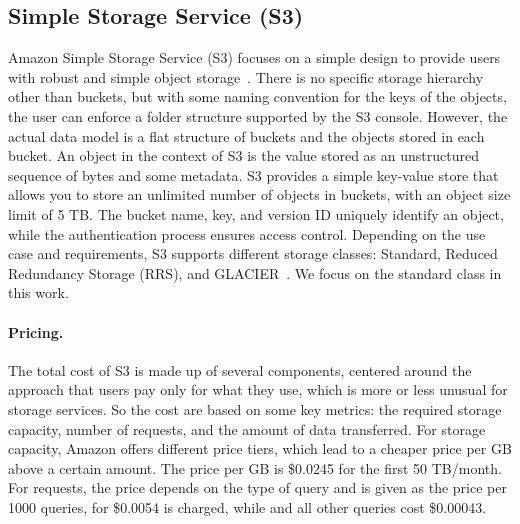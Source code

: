 \subsection{Simple Storage Service (S3)}
\label{subsec:s3}
Amazon Simple Storage Service (S3) focuses on a simple design to provide users with robust and simple object storage~\cite{noauthor_cloud_nodate-1}. There is no specific storage hierarchy other than buckets, but with some naming convention for the keys of the objects, the user can enforce a folder structure supported by the S3 console. However, the actual data model is a flat structure of buckets and the objects stored in each bucket. An object in the context of S3 is the value stored as an unstructured sequence of bytes and some metadata. S3 provides a simple key-value store that allows you to store an unlimited number of objects in buckets, with an object size limit of 5 TB. The bucket name, key, and version ID uniquely identify an object, while the authentication process ensures access control. Depending on the use case and requirements, S3 supports different storage classes: Standard, Reduced Redundancy Storage (RRS), and GLACIER~\cite{noauthor_amazon_nodate-2}. We focus on the standard class in this work.

\paragraph{Pricing.} The total cost of S3 is made up of several components, centered around the approach that users pay only for what they use, which is more or less unusual for storage services. So the cost are based on some key metrics: the required storage capacity, number of requests, and the amount of data transferred. For storage capacity, Amazon offers different price tiers, which lead to a cheaper price per GB above a certain amount. The price per GB is \$0.0245 for the first 50 TB/month. For requests, the price depends on the type of query and is given as the price per 1000 queries, for  \$0.0054 is charged, while  and all other queries cost \$0.00043.

